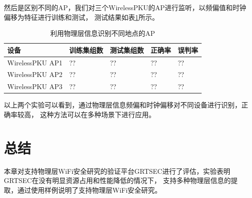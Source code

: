     然后是区别不同的AP，我们对三个WirelessPKU的AP进行监听，以频偏值和时钟偏移为特征进行训练和测试，
    测试结果如表\ref{tab:envaluate_identify_ap}所示。
      \begin{table}[!hbp]
      \centering
      \caption{利用物理层信息识别不同地点的AP}
      \label{tab:envaluate_identify_ap}
        \begin{tabular}{|l|l|l|l|l|} \hline
        设备 & 训练集组数 & 测试集组数 & 正确率 & 误判率 \\ \hline
        WirelessPKU AP1 & ?? & ?? & ?? & ?? \\ \hline
        WirelessPKU AP2 & ?? & ?? & ?? & ?? \\ \hline
        WirelessPKU AP3 & ?? & ?? & ?? & ?? \\ \hline
        \end{tabular}
      \end{table}

    以上两个实验可以看到，通过物理层信息频偏和时钟偏移对不同设备进行识别，正确率较高，
    这种方法可以在多种场景下进行应用。

  \section{总结}\label{sec:envaluation_summary}
  本章对支持物理层WiFi安全研究的验证平台GRTSEC进行了评估，实验表明GRTSEC在没有明显资源占用和性能降低的情况下，
  支持多种物理层信息的提取，通过使用样例说明了支持物理层WiFi安全研究。

